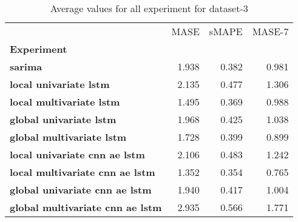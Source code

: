 \begin{table}[h]
\centering
\caption{Average values for all experiment for dataset-3}
\label{table:Average-metric-dataset-3}
\begin{tabular}{lrrr}
\toprule
{} &   MASE &  sMAPE &  MASE-7 \\
\textbf{Experiment                     } &        &        &         \\
\midrule
\textbf{sarima                         } &  1.938 &  0.382 &   0.981 \\
\textbf{local univariate lstm          } &  2.135 &  0.477 &   1.306 \\
\textbf{local multivariate lstm        } &  1.495 &  0.369 &   0.988 \\
\textbf{global univariate lstm         } &  1.968 &  0.425 &   1.038 \\
\textbf{global multivariate lstm       } &  1.728 &  0.399 &   0.899 \\
\textbf{local univariate cnn ae lstm   } &  2.106 &  0.483 &   1.242 \\
\textbf{local multivariate cnn ae lstm } &  1.352 &  0.354 &   0.765 \\
\textbf{global univariate cnn ae lstm  } &  1.940 &  0.417 &   1.004 \\
\textbf{global multivariate cnn ae lstm} &  2.935 &  0.566 &   1.771 \\
\bottomrule
\end{tabular}
\end{table}
